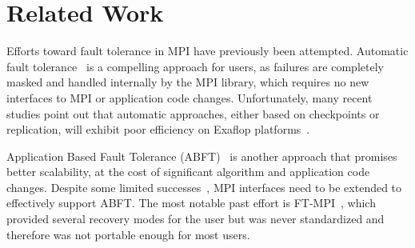 \section{Related Work}
\label{sect:related}

Efforts toward fault tolerance in MPI have previously been attempted.  Automatic
fault tolerance~\cite{Bouteiller10Redesign,MPICHVblocking} is a compelling
approach for users, as failures are completely masked and handled internally by
the MPI library, which requires no new interfaces to MPI or application code
changes. Unfortunately, many recent studies point out that automatic approaches,
either based on checkpoints or replication, will exhibit poor efficiency on
Exaflop platforms~\cite{BOSILCA-2012-696154,lawn265}.

Application Based Fault Tolerance
(ABFT)~\cite{fthpl2011,pengduppopp12,huang1984algorithm} is another approach
that promises better scalability, at the cost of significant algorithm and 
application code changes. Despite some limited 
successes~\cite{europar12/onfailureckpt,Gropp:2004:FTM:1080704.1080714},
MPI interfaces need to be extended to effectively support ABFT. The most notable past 
effort is FT-MPI~\cite{fagg2000ft}, which provided several recovery modes for the user 
but was never standardized and therefore was not portable enough for most users.